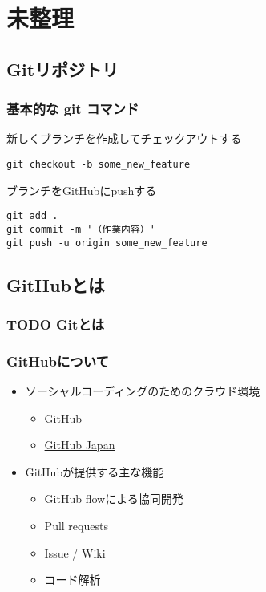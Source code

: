 \documentclass[a4paper,twoside,twocolumn]{bxjsarticle}
\begin{document}
\section{未整理}
\label{sec-2}
\subsection{Gitリポジトリ}
\label{sec-2-1}
\subsubsection{基本的な git コマンド}
\label{sec-2-1-1}
新しくブランチを作成してチェックアウトする

\begin{verbatim}
git checkout -b some_new_feature
\end{verbatim}

ブランチをGitHubにpushする

\begin{verbatim}
git add .
git commit -m '（作業内容）'
git push -u origin some_new_feature
\end{verbatim}


\subsection{GitHubとは}
\label{sec-2-2}
\subsubsection{{\bfseries\sffamily TODO} Gitとは}
\label{sec-2-2-1}
\subsubsection{GitHubについて}
\label{sec-2-2-2}
\begin{itemize}
\item ソーシャルコーディングのためのクラウド環境
\begin{itemize}
\item \href{https://github.com/}{GitHub}
\item \href{http://github.co.jp/}{GitHub Japan}
\end{itemize}
\item GitHubが提供する主な機能
\begin{itemize}
\item GitHub flowによる協同開発
\item Pull requests
\item Issue / Wiki
\item コード解析
\end{itemize}
\end{itemize}
\end{document}
